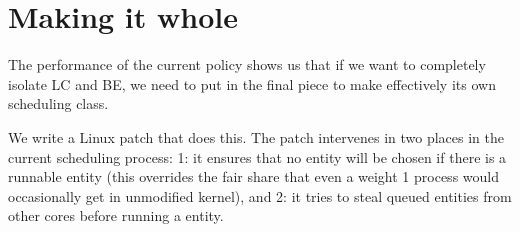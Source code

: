 
\section{Making it whole}
\label{sec:my-patch}

The performance of the current \schedidle{} policy shows us that if we want to
completely isolate LC and BE, we need to put in the final piece to make
\schedidle{} effectively its own scheduling class.

We write a Linux patch that does this. The patch intervenes in two places in the
current scheduling process: 1: it ensures that no \schedidle{} entity will be
chosen if there is a runnable \schednormal{} entity (this overrides the fair
share that even a weight 1 process would occasionally get in unmodified kernel),
and 2: it tries to steal queued \schednormal{} entities from other cores before
running a \schedidle{} entity.

